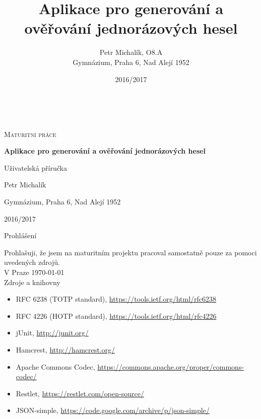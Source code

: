 \documentclass[12pt,opeany,a4paper,oneside]{book}
\author{Petr Michalík, O8.A\\Gymnázium, Praha 6, Nad Alejí 1952}
\title{Aplikace pro generování a ověřování jednorázových hesel}
\date{2016/2017}
\begin{document}
\begin{titlepage}
	\centering	
	{~\par}
	\vspace{4cm}
	{\scshape\LARGE  Maturitní práce  \par}
	\vspace{1cm}
	{\huge\bfseries Aplikace pro generování a ověřování jednorázových hesel \par}
	\vspace{1cm}
	{\large Uživatelská příručka \par}
	\vspace{4cm}
	
	\vfill
	
	{\large Petr Michalík \par}
	{\large Gymnázium, Praha 6, Nad Alejí 1952 \par}
	{\large 2016/2017\par}
\end{titlepage}

\pagestyle{plain}
\setcounter{page}{2}
\justify
{\normalfont\huge Prohlášení}
\vspace{2cm}

\raggedright
Prohlašuji, že jsem na maturitním projektu pracoval samostatně pouze za pomoci uvedených zdrojů.
\\
\vfill
{V Praze \today}
\\
\clearpage
\shorthandoff{-}\shorthandon{-}
\justify
{\normalfont\huge Zdroje a knihovny}
\vspace{2cm}

\begin{itemize}
\item RFC 6238 (TOTP standard), \url{https://tools.ietf.org/html/rfc6238}
\item RFC 4226 (HOTP standard), \url{https://tools.ietf.org/html/rfc4226}
\item jUnit, \url{http://junit.org/}
\item Hamcrest, \url{http://hamcrest.org/}
\item Apache Commons Codec, \url{https://commons.apache.org/proper/commons-codec/}
\item Restlet, \url{https://restlet.com/open-source/}
\item JSON-simple, \url{https://code.google.com/archive/p/json-simple/}
\end{itemize}
\end{document}
